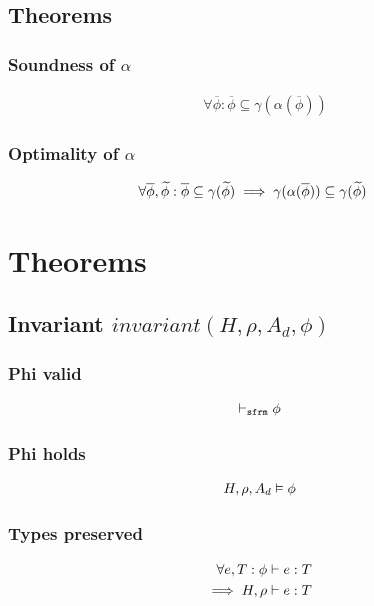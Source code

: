 \documentclass[11pt,a4paper]{article}
\begin{document}
\subsection{Theorems}
\subsubsection{Soundness of $\alpha$}
\begin{align*}
&\forall \overline{\phi} : \overline{\phi} \subseteq \gamma(\alpha(\overline{\phi}))
\end{align*}
\subsubsection{Optimality of $\alpha$}
\begin{align*}
&\forall \overline{\phi}, \widetilde{\phi} : \overline{\phi} \subseteq \gamma(\widetilde{\phi}) \implies  \gamma(\alpha(\overline{\phi}))\subseteq
\gamma(\widetilde{\phi}) 
\end{align*}

\section{Theorems}
\subsection{Invariant $invariant(H, \rho, A_d, \phi)$}

\subsubsection{Phi valid}
\begin{align*}
    \vdash_\texttt{sfrm} {\phi}
\end{align*}

\subsubsection{Phi holds}
\begin{align*}
    H,\rho,A_d \vDash \phi
\end{align*}

\subsubsection{Types preserved}
\begin{align*}
    \forall e, T : \phi \vdash e : T& \\
    \implies H, \rho \vdash e : T&
\end{align*}
\end{document}
